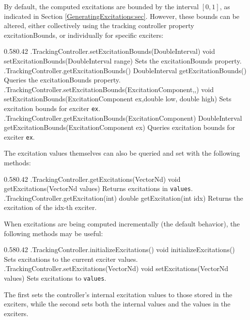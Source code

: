 By default, the computed excitations are bounded by the interval $[0,1]$, as
indicated in Section \ref{GeneratingExcitations:sec}. However, these bounds can
be altered, either collectively using the tracking controller property {\sf
excitationBounds}, or individually for specific exciters:

%
\begin{methodtable}{0.58}{0.42}
\midline
%
\methodentry
{\inverse.TrackingController.setExcitationBounds(DoubleInterval)}%
{void setExcitationBounds(DoubleInterval range)}%
{Sets the excitationBounds property.}%
%
\methodentry
{\inverse.TrackingController.getExcitationBounds()}%
{DoubleInterval getExcitationBounds()}%
{Queries the excitationBounds property.}%
%
\methodspace{0.5em}%
%
\methodentry
{\inverse.TrackingController.setExcitationBounds(ExcitationComponent,,)}%
{void setExcitationBounds(ExcitationComponent ex,\brh double low, double high)}%
{Sets excitation bounds for exciter {\tt ex}.}%
%
\methodentry
{\inverse.TrackingController.getExcitationBounds(ExcitationComponent)}%
{DoubleInterval getExcitationBounds(ExcitationComponent ex)}%
{Queries excitation bounds for exciter {\tt ex}.}%
%
\midline
\end{methodtable}
%

The excitation values themselves can also be queried and set with the following
methods:
%
\begin{methodtable}{0.58}{0.42}
\midline
%
\methodentry
{\inverse.TrackingController.getExcitations(VectorNd)}%
{void getExcitations(VectorNd values)}%
{Returns excitations in {\tt values}.}%
%
\methodentry
{\inverse.TrackingController.getExcitation(int)}%
{double getExcitation(int idx)}%
{Returns the excitation of the idx-th exciter.}%
%
\midline
\end{methodtable}
%

When excitations are being computed incrementally (the default
behavior), the following methods may be useful:
%
\begin{methodtable}{0.58}{0.42}
\midline
%
\methodentry
{\inverse.TrackingController.initializeExcitations()}%
{void initializeExcitations()}%
{Sets excitations to the current exciter values.}%
%
\methodentry
{\inverse.TrackingController.setExcitations(VectorNd)}%
{void setExcitations(VectorNd values)}%
{Sets excitations to {\tt values}.}%
%
\midline
\end{methodtable}
%
The first sets the controller's internal excitation values to those stored in
the exciters, while the second sets both the internal values and the values in
the exciters.

